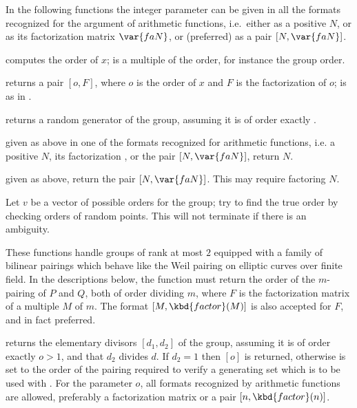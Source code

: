 In the following functions the integer parameter  can be given
in all the formats recognized for the argument of arithmetic functions,
i.e.~either as a positive  $N$, or as its factorization matrix
$\var{faN}$, or (preferred) as a pair $[N,\var{faN}]$.

computes the order of $x$;  is a multiple of the order, for instance
the group order.

 returns a pair $[o,F]$, where $o$ is the order of $x$ and $F$ is the
factorization of $o$;  is as in .

returns a random generator of the group, assuming it is of order exactly
.

 given  as above in one of the
formats recognized for arithmetic functions, i.e. a positive
 $N$, its factorization , or the pair $[N, \var{faN}]$,
return $N$.

 given  as above,
return the pair $[N, \var{faN}]$. This may require factoring $N$.

Let $v$ be a vector of possible orders for the group; try to find the true
order by checking orders of random points. This will not terminate if there
is an ambiguity.


These functions handle groups of rank at most $2$ equipped with a family of
bilinear pairings which behave like the Weil pairing on elliptic curves over
finite field. In the descriptions below, the function  must return the order of the $m$-pairing of $P$ and $Q$, both of order
dividing $m$, where $F$ is the factorization matrix of a multiple $M$ of $m$.
The format $[M, \kbd{factor}(M)]$ is also accepted for $F$, and in fact
preferred.

returns the elementary divisors $[d_1, d_2]$ of the group, assuming it is of
order exactly $o>1$, and that $d_2$ divides $d$. If $d_2=1$ then $[o]$ is
returned, otherwise  is set to the order of the pairing
required to verify a generating set which is to be used with
. For the parameter $o$, all formats recognized by
arithmetic functions are allowed, preferably a factorization matrix or a pair
$[n,\kbd{factor}(n)]$.

